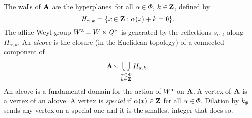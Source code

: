 \documentclass{article}
\begin{document}
The walls of $\mathbf{A}$ are the hyperplanes, for all $\alpha\in \Phi$, 
$k\in \mathbf{Z}$, defined by 
\[
  H_{\alpha,k} = \{x\in \mathbf{Z}:\alpha(x)+k=0\} .
\]
The affine Weyl group $W^{\mathrm{a}}=W\ltimes Q^\vee$ is generated by the 
reflections $s_{\alpha,k}$ along $H_{\alpha,k}$. An \emph{alcove} is the 
closure (in the Euclidean topology) of a connected component of 
\[
  \mathbf{A}\smallsetminus \bigcup_{\substack{\alpha\in \Phi \\ k\in \mathbf{Z}}} H_{\alpha,k} .
\]
An alcove is a fundamental domain for the action of $W^{\mathrm{a}}$ on $\mathbf{A}$. A 
vertex of $\mathbf{A}$ is a vertex of an alcove. A vertex is \emph{special} if 
$\alpha(x)\in \mathbf{Z}$ for all $\alpha\in \Phi$. 
Dilation by $k_\Phi$ sends any vertex on a special one and it is the smallest integer 
that does so. 







\end{document}
